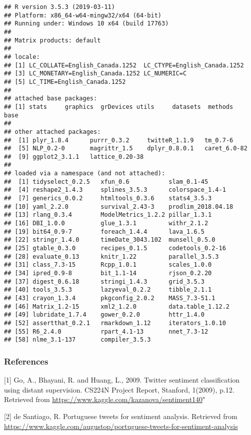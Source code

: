 \documentclass[]{article}
\begin{document}
\begin{verbatim}
## R version 3.5.3 (2019-03-11)
## Platform: x86_64-w64-mingw32/x64 (64-bit)
## Running under: Windows 10 x64 (build 17763)
## 
## Matrix products: default
## 
## locale:
## [1] LC_COLLATE=English_Canada.1252  LC_CTYPE=English_Canada.1252   
## [3] LC_MONETARY=English_Canada.1252 LC_NUMERIC=C                   
## [5] LC_TIME=English_Canada.1252    
## 
## attached base packages:
## [1] stats     graphics  grDevices utils     datasets  methods   base     
## 
## other attached packages:
##  [1] plyr_1.8.4      purrr_0.3.2     twitteR_1.1.9   tm_0.7-6       
##  [5] NLP_0.2-0       magrittr_1.5    dplyr_0.8.0.1   caret_6.0-82   
##  [9] ggplot2_3.1.1   lattice_0.20-38
## 
## loaded via a namespace (and not attached):
##  [1] tidyselect_0.2.5   xfun_0.6           slam_0.1-45       
##  [4] reshape2_1.4.3     splines_3.5.3      colorspace_1.4-1  
##  [7] generics_0.0.2     htmltools_0.3.6    stats4_3.5.3      
## [10] yaml_2.2.0         survival_2.43-3    prodlim_2018.04.18
## [13] rlang_0.3.4        ModelMetrics_1.2.2 pillar_1.3.1      
## [16] DBI_1.0.0          glue_1.3.1         withr_2.1.2       
## [19] bit64_0.9-7        foreach_1.4.4      lava_1.6.5        
## [22] stringr_1.4.0      timeDate_3043.102  munsell_0.5.0     
## [25] gtable_0.3.0       recipes_0.1.5      codetools_0.2-16  
## [28] evaluate_0.13      knitr_1.22         parallel_3.5.3    
## [31] class_7.3-15       Rcpp_1.0.1         scales_1.0.0      
## [34] ipred_0.9-8        bit_1.1-14         rjson_0.2.20      
## [37] digest_0.6.18      stringi_1.4.3      grid_3.5.3        
## [40] tools_3.5.3        lazyeval_0.2.2     tibble_2.1.1      
## [43] crayon_1.3.4       pkgconfig_2.0.2    MASS_7.3-51.1     
## [46] Matrix_1.2-15      xml2_1.2.0         data.table_1.12.2 
## [49] lubridate_1.7.4    gower_0.2.0        httr_1.4.0        
## [52] assertthat_0.2.1   rmarkdown_1.12     iterators_1.0.10  
## [55] R6_2.4.0           rpart_4.1-13       nnet_7.3-12       
## [58] nlme_3.1-137       compiler_3.5.3
\end{verbatim}

\subsubsection{References}\label{references}

{[}1{]} Go, A., Bhayani, R. and Huang, L., 2009. Twitter sentiment
classification using distant supervision. CS224N Project Report,
Stanford, 1(2009), p.12. Retrieved from
\url{https://www.kaggle.com/kazanova/sentiment140}"

{[}2{]} de Santiago, R. Portuguese tweets for sentiment analysis.
Retrieved from
\url{https://www.kaggle.com/augustop/portuguese-tweets-for-sentiment-analysis}
\end{document}
